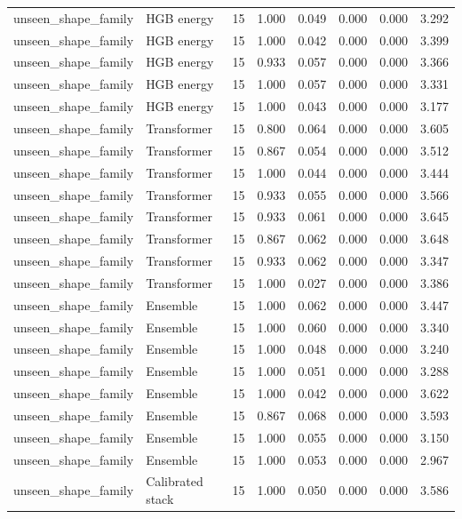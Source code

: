 {\begin{longtable}{llrrrrrr}
unseen\_shape\_family & HGB energy & 15 & 1.000 & 0.049 & 0.000 & 0.000 & 3.292 \\
unseen\_shape\_family & HGB energy & 15 & 1.000 & 0.042 & 0.000 & 0.000 & 3.399 \\
unseen\_shape\_family & HGB energy & 15 & 0.933 & 0.057 & 0.000 & 0.000 & 3.366 \\
unseen\_shape\_family & HGB energy & 15 & 1.000 & 0.057 & 0.000 & 0.000 & 3.331 \\
unseen\_shape\_family & HGB energy & 15 & 1.000 & 0.043 & 0.000 & 0.000 & 3.177 \\
unseen\_shape\_family & Transformer & 15 & 0.800 & 0.064 & 0.000 & 0.000 & 3.605 \\
unseen\_shape\_family & Transformer & 15 & 0.867 & 0.054 & 0.000 & 0.000 & 3.512 \\
unseen\_shape\_family & Transformer & 15 & 1.000 & 0.044 & 0.000 & 0.000 & 3.444 \\
unseen\_shape\_family & Transformer & 15 & 0.933 & 0.055 & 0.000 & 0.000 & 3.566 \\
unseen\_shape\_family & Transformer & 15 & 0.933 & 0.061 & 0.000 & 0.000 & 3.645 \\
unseen\_shape\_family & Transformer & 15 & 0.867 & 0.062 & 0.000 & 0.000 & 3.648 \\
unseen\_shape\_family & Transformer & 15 & 0.933 & 0.062 & 0.000 & 0.000 & 3.347 \\
unseen\_shape\_family & Transformer & 15 & 1.000 & 0.027 & 0.000 & 0.000 & 3.386 \\
unseen\_shape\_family & Ensemble & 15 & 1.000 & 0.062 & 0.000 & 0.000 & 3.447 \\
unseen\_shape\_family & Ensemble & 15 & 1.000 & 0.060 & 0.000 & 0.000 & 3.340 \\
unseen\_shape\_family & Ensemble & 15 & 1.000 & 0.048 & 0.000 & 0.000 & 3.240 \\
unseen\_shape\_family & Ensemble & 15 & 1.000 & 0.051 & 0.000 & 0.000 & 3.288 \\
unseen\_shape\_family & Ensemble & 15 & 1.000 & 0.042 & 0.000 & 0.000 & 3.622 \\
unseen\_shape\_family & Ensemble & 15 & 0.867 & 0.068 & 0.000 & 0.000 & 3.593 \\
unseen\_shape\_family & Ensemble & 15 & 1.000 & 0.055 & 0.000 & 0.000 & 3.150 \\
unseen\_shape\_family & Ensemble & 15 & 1.000 & 0.053 & 0.000 & 0.000 & 2.967 \\
unseen\_shape\_family & Calibrated stack & 15 & 1.000 & 0.050 & 0.000 & 0.000 & 3.586 \\

\end{longtable}}
